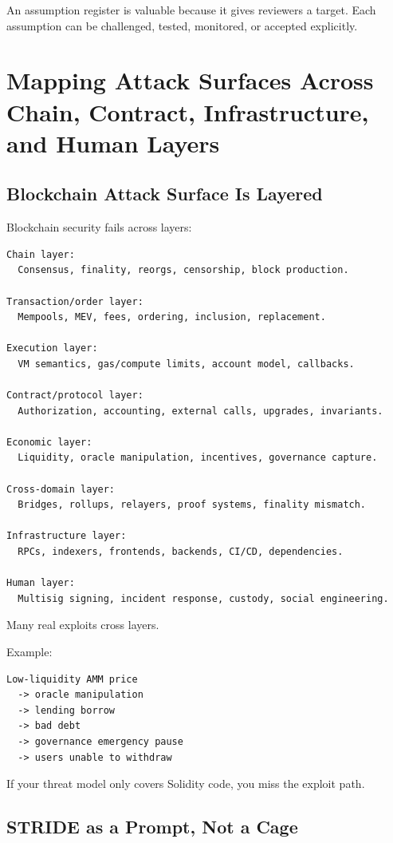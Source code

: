 An assumption register is valuable because it gives reviewers a target.
Each assumption can be challenged, tested, monitored, or accepted
explicitly.

\section{Mapping Attack Surfaces Across Chain, Contract, Infrastructure, and Human Layers}

\subsection{Blockchain Attack Surface Is Layered}

Blockchain security fails across layers:

\begin{lstlisting}
Chain layer:
  Consensus, finality, reorgs, censorship, block production.

Transaction/order layer:
  Mempools, MEV, fees, ordering, inclusion, replacement.

Execution layer:
  VM semantics, gas/compute limits, account model, callbacks.

Contract/protocol layer:
  Authorization, accounting, external calls, upgrades, invariants.

Economic layer:
  Liquidity, oracle manipulation, incentives, governance capture.

Cross-domain layer:
  Bridges, rollups, relayers, proof systems, finality mismatch.

Infrastructure layer:
  RPCs, indexers, frontends, backends, CI/CD, dependencies.

Human layer:
  Multisig signing, incident response, custody, social engineering.
\end{lstlisting}

Many real exploits cross layers.

Example:

\begin{lstlisting}
Low-liquidity AMM price
  -> oracle manipulation
  -> lending borrow
  -> bad debt
  -> governance emergency pause
  -> users unable to withdraw
\end{lstlisting}

If your threat model only covers Solidity code, you miss the exploit
path.

\subsection{STRIDE as a Prompt, Not a Cage}

